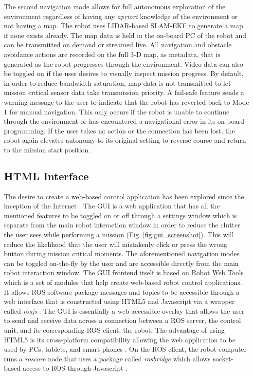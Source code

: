 The second navigation mode allows for full autonomous exploration of the environment regardless of having any \emph{apriori} knowledge of the environment or not having a map. The robot uses LIDAR-based SLAM-EKF \cite{weingarten2005ekf, castellanos2007robocentric} to generate a map if none exists already. The map data is held in the on-board PC of the robot and can be transmitted on demand or streamed live. All navigation and obstacle avoidance actions are recorded on the full 3-D map, as metadata, that is generated as the robot progresses through the environment. Video data can also be toggled on if the user desires to visually inspect mission progress. By default, in order to reduce bandwidth saturation, map data is not transmitted to let mission critical sensor data take transmission priority.  A fail-safe feature sends a warning message to the user to indicate that the robot has reverted back to Mode 1 for manual navigation. This only occurs if the robot is unable to continue through the environment or has encountered a navigational error in its on-board programming. If the user takes no action or the connection has been lost, the robot again elevates autonomy to its original setting to reverse course and return to the mission start position. 

\subsection{HTML Interface}

The desire to create a web-based control application has been explored since the inception of the Internet \cite{goldberg2002beyond}. The GUI is a web application that has all the mentioned features to be toggled on or off through a settings window which is separate from the main robot interaction window in order to reduce the clutter the user sees while performing a mission (Fig. \ref{fig:gui_screenshot}). This will reduce the likelihood that the user will mistakenly click or press the wrong button during mission critical moments. The aforementioned navigation modes can be toggled on-the-fly by the user and are accessible directly from the main robot interaction window. The GUI frontend itself is based on Robot Web Tools \cite{webtools,lee2012web} which is a set of modules that help create web-based robot control applications. It allows ROS software package messages and topics to be accessible through a web interface that is constructed using HTML5 and Javascript via a wrapper called \textit{rosjs} \cite{osentoski2011robots}. The GUI is essentially a web accessible overlay that allows the user to send and receive data across a connection between a ROS server, the control unit, and its corresponding ROS client, the robot. The advantage of using HTML5 is its cross-platform compatibility allowing the web application to be used by PCs, tablets, and smart phones \cite{hilton2014lightweight}. On the ROS client, the robot computer runs a \textit{roscore} node that uses a package called \textit{rosbridge} which allows socket-based access to ROS through Javascript \cite{crick2011rosbridge}.

